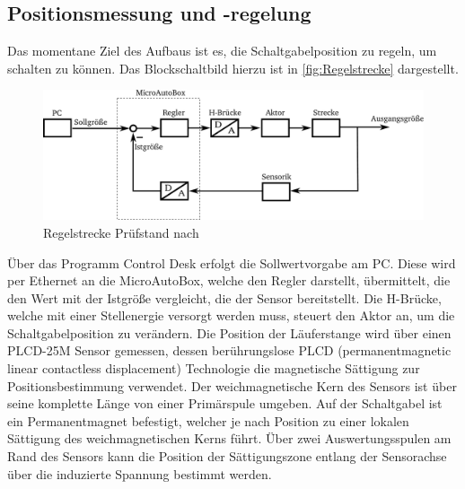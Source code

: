 \subsection {Positionsmessung und -regelung}\label{regler}

Das momentane Ziel des Aufbaus ist es, die Schaltgabelposition zu regeln, um schalten zu können. Das Blockschaltbild hierzu ist in \autoref{fig:Regelstrecke} dargestellt.
\begin{figure}[H]
	\centering
		\includegraphics[width=0.95\columnwidth]{Bilder/Schaltgabelregelung.pdf}
	\caption{Regelstrecke Prüfstand nach \cite{adp}}
	\label{fig:Regelstrecke}
\end{figure} \noindent
Über das Programm Control Desk erfolgt die Sollwertvorgabe am PC. Diese wird per Ethernet an die MicroAutoBox, welche den Regler darstellt, übermittelt, die den Wert mit der Istgröße vergleicht, die der Sensor bereitstellt. Die H-Brücke, welche mit einer Stellenergie versorgt werden muss, steuert den Aktor an, um die Schaltgabelposition zu verändern.
Die Position der Läuferstange wird über einen PLCD-25M Sensor gemessen, dessen berührungslose PLCD (permanentmagnetic linear contactless displacement) Technologie die magnetische Sättigung zur Positionsbestimmung verwendet. Der weichmagnetische Kern des Sensors ist über seine komplette Länge von einer Primärspule umgeben. Auf der Schaltgabel ist ein Permanentmagnet befestigt, welcher je nach Position zu einer lokalen Sättigung des weichmagnetischen Kerns führt. Über zwei Auswertungsspulen am Rand des Sensors kann die Position der Sättigungszone entlang der Sensorachse über die induzierte Spannung bestimmt werden.

